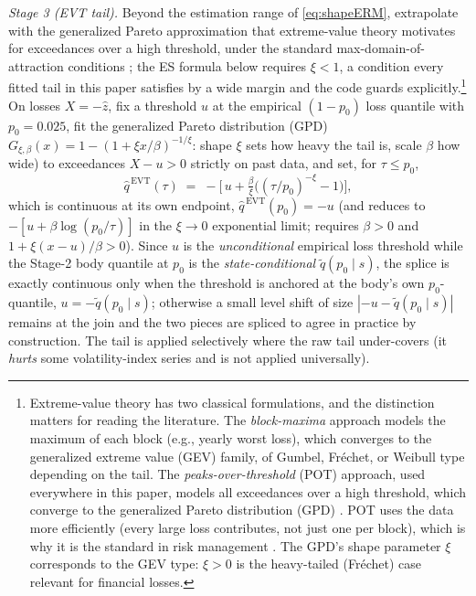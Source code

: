 \documentclass[11pt]{article}
\theoremstyle{remark}
\begin{document}
\emph{Stage 3 (EVT tail).} Beyond the estimation range of
\eqref{eq:shapeERM}, extrapolate with the generalized Pareto
approximation that extreme-value theory motivates for exceedances over
a high threshold, under the standard max-domain-of-attraction
conditions \citep{pickands1975, mcneilfrey2000}; the ES formula below
requires $\xi<1$, a condition every fitted tail in this paper
satisfies by a wide margin and the code guards explicitly.\footnote{Extreme-value theory has two classical
formulations, and the distinction matters for reading the literature.
The \emph{block-maxima} approach models the maximum of each block (e.g.,
yearly worst loss), which converges to the generalized extreme value
(GEV) family, of Gumbel, Fr\'echet, or Weibull type depending on the
tail. The \emph{peaks-over-threshold} (POT) approach, used everywhere in
this paper, models all exceedances over a high threshold, which converge
to the generalized Pareto distribution (GPD)
\citep{balkema1974,pickands1975}. POT uses the data more efficiently
(every large loss contributes, not just one per block), which is why it
is the standard in risk management \citep{mcneilfrey2000,
embrechts1997}. The GPD's shape parameter $\xi$ corresponds to the
GEV type: $\xi>0$ is the heavy-tailed (Fr\'echet) case relevant for
financial losses.} On losses $X=-\widehat{z}$, fix a threshold $u$ at the
empirical $(1-p_0)$ loss quantile with $p_0 = 0.025$, fit the
generalized Pareto distribution (GPD)
$G_{\xi,\beta}(x) = 1-(1+\xi x/\beta)^{-1/\xi}$: shape $\xi$ sets how
heavy the tail is, scale $\beta$ how wide) to exceedances
$X - u > 0$ strictly on past data, and set, for $\tau \le p_0$,
\begin{equation}
\widehat{q}^{\,\mathrm{EVT}}(\tau)
\;=\; -\Big[\, u + \tfrac{\beta}{\xi}\big( (\tau/p_0)^{-\xi} - 1 \big)
\Big],
\label{eq:evt}
\end{equation}
which is continuous at its own endpoint, $\widehat q^{\,\mathrm{EVT}}(p_0)
= -u$ (and reduces to $-[u+\beta\log(p_0/\tau)]$ in the $\xi\to0$
exponential limit; requires $\beta>0$ and $1+\xi(x-u)/\beta>0$). Since
$u$ is the \emph{unconditional} empirical loss threshold while the
Stage-2 body quantile at $p_0$ is the \emph{state-conditional}
$\widetilde q(p_0\mid s)$, the splice is exactly continuous only when
the threshold is anchored at the body's own $p_0$-quantile,
$u = -\widetilde q(p_0\mid s)$; otherwise a small level shift of size
$|{-}u - \widetilde q(p_0\mid s)|$ remains at the join and the two
pieces are spliced to agree in practice by construction. The tail is
applied selectively where the raw tail under-covers (it \emph{hurts}
some volatility-index series and is not applied universally).
\end{document}
